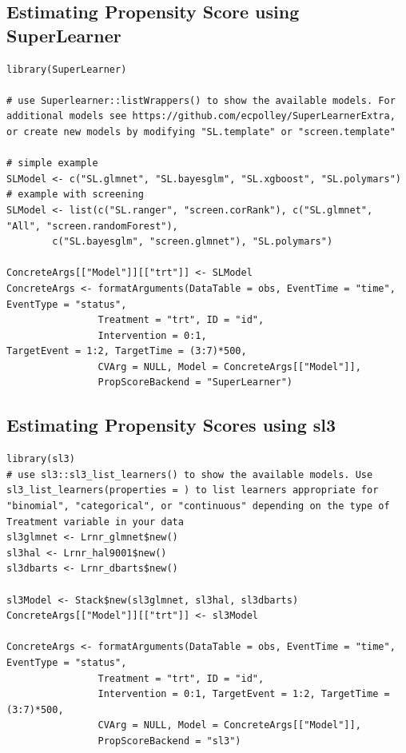 \documentclass{report}
\newcommand{\1}{\ensuremath{\mathbf{1}}}
\begin{document}
\subsection{Estimating Propensity Score using SuperLearner}
\label{sec:org4c0fefb}


\begin{lstlisting}
library(SuperLearner)

# use Superlearner::listWrappers() to show the available models. For additional models see https://github.com/ecpolley/SuperLearnerExtra, or create new models by modifying "SL.template" or "screen.template"

# simple example
SLModel <- c("SL.glmnet", "SL.bayesglm", "SL.xgboost", "SL.polymars")
# example with screening
SLModel <- list(c("SL.ranger", "screen.corRank"), c("SL.glmnet", "All", "screen.randomForest"), 
		c("SL.bayesglm", "screen.glmnet"), "SL.polymars")

ConcreteArgs[["Model"]][["trt"]] <- SLModel
ConcreteArgs <- formatArguments(DataTable = obs, EventTime = "time", EventType = "status", 
				Treatment = "trt", ID = "id", 
				Intervention = 0:1,
TargetEvent = 1:2, TargetTime = (3:7)*500, 
				CVArg = NULL, Model = ConcreteArgs[["Model"]], 
				PropScoreBackend = "SuperLearner")
\end{lstlisting}



\subsection{Estimating Propensity Scores using sl3}
\label{sec:orgceea645}

\begin{lstlisting}
library(sl3)
# use sl3::sl3_list_learners() to show the available models. Use sl3_list_learners(properties = ) to list learners appropriate for "binomial", "categorical", or "continuous" depending on the type of Treatment variable in your data
sl3glmnet <- Lrnr_glmnet$new()
sl3hal <- Lrnr_hal9001$new()
sl3dbarts <- Lrnr_dbarts$new()

sl3Model <- Stack$new(sl3glmnet, sl3hal, sl3dbarts)
ConcreteArgs[["Model"]][["trt"]] <- sl3Model

ConcreteArgs <- formatArguments(DataTable = obs, EventTime = "time", EventType = "status", 
				Treatment = "trt", ID = "id", 
				Intervention = 0:1, TargetEvent = 1:2, TargetTime = (3:7)*500, 
				CVArg = NULL, Model = ConcreteArgs[["Model"]], 
				PropScoreBackend = "sl3")
\end{lstlisting}
\end{document}
